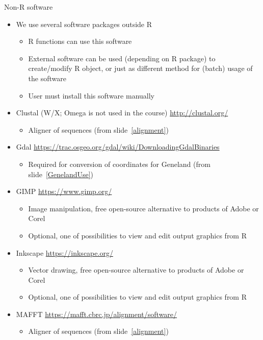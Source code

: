 \documentclass[compress, ucs, xelatex, 11pt, xcolor=svgnames,
  hyperref={
    bookmarks=true,
    unicode=true,
    colorlinks=true,
    pdftitle={Molecular data in R},
    plainpages=false,
    pdfauthor={Vojtech Zeisek},
    pdfsubject={Course about phylogeny and evolution in R},
    pdfcreator={XeLaTeX},
    pdfkeywords={R, evolution, phylogeny, molecular data},
    linkcolor=Tomato,
    anchorcolor=SaddleBrown,
    citecolor=Goldenrod,
    filecolor=DarkMagenta,
    menucolor=Sienna,
    urlcolor=DarkTurquoise,
    pdftex},
  url={hyphens, lowtilde} %
  ]{beamer}
\begin{document}
\begin{frame}[allowframebreaks]{Non-R software}
  \begin{itemize}
    \item We use several software packages outside R
    \begin{itemize}
      \item R functions can use this software
      \item External software can be used (depending on R package) to create/modify R object, or just as different method for (batch) usage of the software
      \item User must install this software manually
    \end{itemize}
    \item Clustal (W/X; Omega is not used in the course) \url{http://clustal.org/}
    \begin{itemize}
      \item Aligner of sequences (from slide~\ref{alignment})
    \end{itemize}
    \item Gdal \url{https://trac.osgeo.org/gdal/wiki/DownloadingGdalBinaries}
    \begin{itemize}
      \item Required for conversion of coordinates for Geneland (from slide~\ref{GenelandUse})
    \end{itemize}
    \item GIMP \url{https://www.gimp.org/}
    \begin{itemize}
      \item Image manipulation, free open-source alternative to products of Adobe or Corel
      \item Optional, one of possibilities to view and edit output graphics from R
    \end{itemize}
    \item Inkscape \url{https://inkscape.org/}
    \begin{itemize}
      \item Vector drawing, free open-source alternative to products of Adobe or Corel
      \item Optional, one of possibilities to view and edit output graphics from R
    \end{itemize}
    \item MAFFT \url{https://mafft.cbrc.jp/alignment/software/}
    \begin{itemize}
      \item Aligner of sequences (from slide~\ref{alignment})

\end{itemize}
\end{itemize}
\end{frame}
\end{document}
